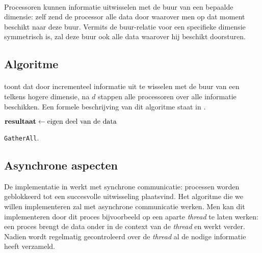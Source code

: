 \paragraph{}
Processoren kunnen informatie uitwisselen met de buur van een bepaalde dimensie: zelf zend de processor alle data door waarover men op dat moment beschikt naar deze buur. Vermits de buur-relatie voor een specifieke dimensie symmetrisch is, zal deze buur ook alle data waarover hij beschikt doorsturen.

\paragraph{}


\subsection{Algoritme}

\paragraph{}
 toont dat door incrementeel informatie uit te wisselen met de buur van een telkens hogere dimensie, na $d$ stappen alle processoren over alle informatie beschikken. Een formele beschrijving van dit algoritme staat in .

\begin{algorithm}[hbt]
 $\mbox{\textbf{resultaat}}\leftarrow\mbox{eigen deel van de data}$\;
 \caption{\texttt{GatherAll}\cite{books/bc/KumarGGK94}.}
\end{algorithm}

\subsection{Asynchrone aspecten}

De implementatie in  werkt met synchrone communicatie: processen worden geblokkeerd tot een succesvolle uitwisseling plaatsvind. Het algoritme die we willen implementeren zal met asynchrone communicatie werken. Men kan dit implementeren door dit proces bijvoorbeeld op een aparte \emph{thread} te laten werken: een proces brengt de data onder in de context van de \emph{thread} en werkt verder. Nadien wordt regelmatig gecontroleerd over de \emph{thread} al de nodige informatie heeft verzameld.

